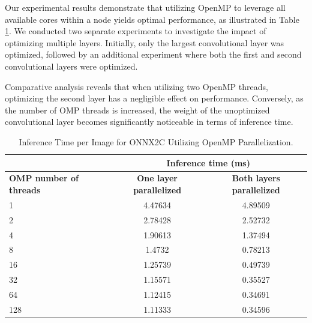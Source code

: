\documentclass[fleqn,10pt]{olplainarticle}
\begin{document}
Our experimental results demonstrate that utilizing OpenMP to leverage all available cores within a node yields optimal performance, as illustrated in Table \ref{tab:onnx2c_omp}. We conducted two separate experiments to investigate the impact of optimizing multiple layers. Initially, only the largest convolutional layer was optimized, followed by an additional experiment where both the first and second convolutional layers were optimized.

Comparative analysis reveals that when utilizing two OpenMP threads, optimizing the second layer has a negligible effect on performance. Conversely, as the number of OMP threads is increased, the weight of the unoptimized convolutional layer becomes significantly noticeable in terms of inference time.

\begin{table}[!ht]
    \centering
    \begin{tabular}{l|cc|}
    \cline{2-3}
    \textbf{}                                            & \multicolumn{2}{c|}{\textbf{Inference time (ms)}}                                        \\ \hline
    \multicolumn{1}{|l|}{\textbf{OMP number of threads}} & \multicolumn{1}{c|}{\textbf{One layer parallelized}} & \textbf{Both layers parallelized} \\ \hline
    \multicolumn{1}{|l|}{1}                              & \multicolumn{1}{c|}{4.47634}                         & 4.89509                           \\ \hline
    \multicolumn{1}{|l|}{2}                              & \multicolumn{1}{c|}{2.78428}                         & 2.52732                           \\ \hline
    \multicolumn{1}{|l|}{4}                              & \multicolumn{1}{c|}{1.90613}                         & 1.37494                           \\ \hline
    \multicolumn{1}{|l|}{8}                              & \multicolumn{1}{c|}{1.4732}                          & 0.78213                           \\ \hline
    \multicolumn{1}{|l|}{16}                             & \multicolumn{1}{c|}{1.25739}                         & 0.49739                           \\ \hline
    \multicolumn{1}{|l|}{32}                             & \multicolumn{1}{c|}{1.15571}                         & 0.35527                           \\ \hline
    \multicolumn{1}{|l|}{64}                             & \multicolumn{1}{c|}{1.12415}                         & 0.34691                           \\ \hline
    \multicolumn{1}{|l|}{128}                            & \multicolumn{1}{c|}{1.11333}                         & 0.34596                           \\ \hline
    \end{tabular}
    \caption{Inference Time per Image for ONNX2C Utilizing OpenMP Parallelization.}
    \label{tab:onnx2c_omp}
\end{table}
\end{document}
